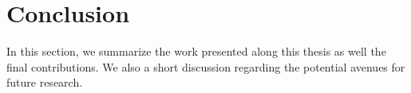 \acresetall
\chapter{Conclusion}\label{chap:7}

In this section, we summarize the work presented along this thesis as well the final contributions.
We also a short discussion regarding the potential avenues for future research.


